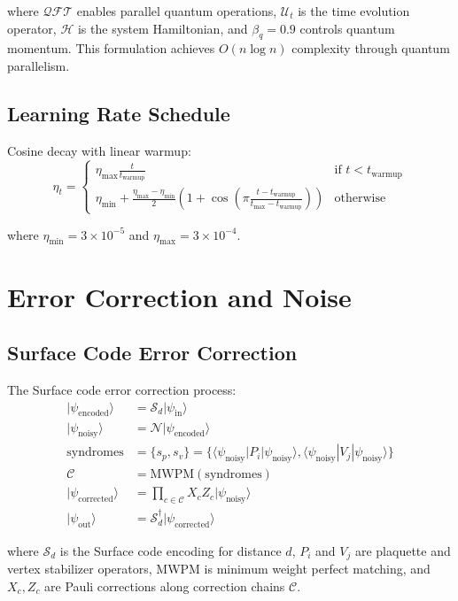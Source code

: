 \documentclass{article}
\begin{document}
where $\mathcal{QFT}$ enables parallel quantum operations, $\mathcal{U}_t$ is the time evolution operator, $\mathcal{H}$ is the system Hamiltonian, and $\beta_q=0.9$ controls quantum momentum. This formulation achieves $O(n\log n)$ complexity through quantum parallelism.

\subsection{Learning Rate Schedule}
Cosine decay with linear warmup:
\begin{equation}
\eta_t = \begin{cases}
\eta_{\text{max}}\frac{t}{t_{\text{warmup}}} & \text{if } t < t_{\text{warmup}} \\
\eta_{\text{min}} + \frac{\eta_{\text{max}}-\eta_{\text{min}}}{2}(1 + \cos(\pi\frac{t-t_{\text{warmup}}}{t_{\text{max}}-t_{\text{warmup}}})) & \text{otherwise}
\end{cases}
\end{equation}

where $\eta_{\text{min}}=3\times10^{-5}$ and $\eta_{\text{max}}=3\times10^{-4}$.

\section{Error Correction and Noise}

\subsection{Surface Code Error Correction}
The Surface code error correction process:
\begin{align*}
|\psi_{\text{encoded}}\rangle &= \mathcal{S}_d|\psi_{\text{in}}\rangle \\
|\psi_{\text{noisy}}\rangle &= \mathcal{N}|\psi_{\text{encoded}}\rangle \\
\text{syndromes} &= \{s_p, s_v\} = \{\langle \psi_{\text{noisy}}|P_i|\psi_{\text{noisy}}\rangle, \langle \psi_{\text{noisy}}|V_j|\psi_{\text{noisy}}\rangle\} \\
\mathcal{C} &= \text{MWPM}(\text{syndromes}) \\
|\psi_{\text{corrected}}\rangle &= \prod_{c \in \mathcal{C}} X_c Z_c |\psi_{\text{noisy}}\rangle \\
|\psi_{\text{out}}\rangle &= \mathcal{S}_d^\dagger|\psi_{\text{corrected}}\rangle
\end{align*}

where $\mathcal{S}_d$ is the Surface code encoding for distance $d$, $P_i$ and $V_j$ are plaquette and vertex stabilizer operators, MWPM is minimum weight perfect matching, and $X_c, Z_c$ are Pauli corrections along correction chains $\mathcal{C}$.
\end{document}
